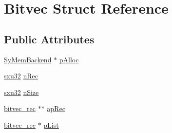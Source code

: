 \hypertarget{struct_bitvec}{\section{Bitvec Struct Reference}
\label{d1/d89/struct_bitvec}
}
\subsection*{Public Attributes}
\begin{DoxyCompactItemize}
\item 
\hyperlink{struct_sy_mem_backend}{Sy\-Mem\-Backend} $\ast$ \hyperlink{struct_bitvec_a3afb07b9af8a05a52168b0b4e80c6657}{p\-Alloc}
\item 
\hyperlink{unqlite_8c_abc5a8a3f345c200c98c485551f49666e}{sxu32} \hyperlink{struct_bitvec_a769dc2d5dd2e4c1b4ce3c685263a59f1}{n\-Rec}
\item 
\hyperlink{unqlite_8c_abc5a8a3f345c200c98c485551f49666e}{sxu32} \hyperlink{struct_bitvec_a66ca53c19baef4df2d8e5c08838cf61d}{n\-Size}
\item 
\hyperlink{structbitvec__rec}{bitvec\-\_\-rec} $\ast$$\ast$ \hyperlink{struct_bitvec_a02bb36fb54a6f9f30caa88113e3bbe6b}{ap\-Rec}
\item 
\hyperlink{structbitvec__rec}{bitvec\-\_\-rec} $\ast$ \hyperlink{struct_bitvec_a012332012731a4b31ea49a4108a568f3}{p\-List}
\end{DoxyCompactItemize}


